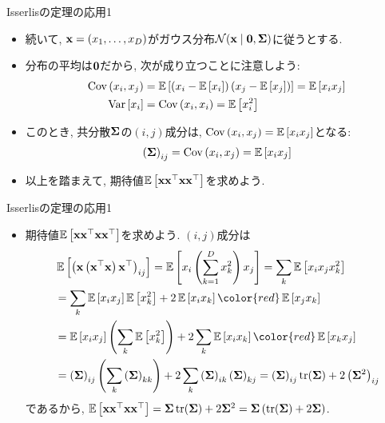 \documentclass[dvipdfmx,notheorems,t]{beamer}
\begin{document}
\begin{frame}{Isserlisの定理の応用1}
\begin{itemize}
  \item 続いて, $\vb{x} = (x_1, \ldots, x_D)$がガウス分布$\mathcal{N}(\vb{x} \mid \vb{0}, \vb{\Sigma})$に従うとする.
  \item 分布の平均は$\vb{0}$だから, 次が成り立つことに注意しよう:
  \begin{align*}
    \operatorname{Cov} \left( x_i, x_j \right) &= \operatorname{\mathbb{E}} \left[ \left( x_i - \operatorname{\mathbb{E}} \left[ x_i \right] \right) \left( x_j - \operatorname{\mathbb{E}} \left[ x_j \right] \right) \right] = \operatorname{\mathbb{E}} \left[ x_i x_j \right] \\
    \operatorname{Var} \left[ x_i \right] &= \operatorname{Cov} \left( x_i, x_i \right) = \operatorname{\mathbb{E}} \left[ x_i^2 \right]
  \end{align*}
  \item このとき, 共分散$\vb{\Sigma}$の$(i, j)$成分は, $\operatorname{Cov} \left( x_i, x_j \right) = \operatorname{\mathbb{E}} \left[ x_i x_j \right]$となる:
  \begin{align*}
    \left( \vb{\Sigma} \right)_{ij} = \operatorname{Cov} \left( x_i, x_j \right) = \operatorname{\mathbb{E}} \left[ x_i x_j \right]
  \end{align*}
  \item 以上を踏まえて, 期待値$\operatorname{\mathbb{E}} \left[ \vb{x} \vb{x}^\top \vb{x} \vb{x}^\top \right]$を求めよう.
\end{itemize}
\end{frame}

\begin{frame}{Isserlisの定理の応用1}
\begin{itemize}
  \item 期待値$\operatorname{\mathbb{E}} \left[ \vb{x} \vb{x}^\top \vb{x} \vb{x}^\top \right]$を求めよう. $(i, j)$成分は
  \begin{align*}
    & \E{\left( \vb{x} \left( \vb{x}^\top \vb{x} \right) \vb{x}^\top \right)_{ij}}
    = \E{x_i \left( \sum_{k = 1}^D x_k^2 \right) x_j}
    = \sum_k \E{x_i x_j x_k^2} \\
    &= \sum_k \E{x_i x_j} \E{x_k^2} + 2 \E{x_i x_k} {\color{red} \E{x_j x_k}} \\
    &= \E{x_i x_j} \left( \sum_k \E{x_k^2} \right)
      + 2 \sum_k \E{x_i x_k} {\color{red} \E{x_k x_j}} \\
    &= \left( \vb{\Sigma} \right)_{ij} \left( \sum_k \left( \vb{\Sigma} \right)_{kk} \right)
      + 2 \sum_k \left( \vb{\Sigma} \right)_{ik} \left( \vb{\Sigma} \right)_{kj}
    = \left( \vb{\Sigma} \right)_{ij} \tr(\vb{\Sigma}) + 2 \left( \vb{\Sigma}^2 \right)_{ij}
  \end{align*}
  であるから, $\operatorname{\mathbb{E}} \left[ \vb{x} \vb{x}^\top \vb{x} \vb{x}^\top \right] = \vb{\Sigma} \tr(\vb{\Sigma}) + 2 \vb{\Sigma}^2
    = \vb{\Sigma} \left( \tr(\vb{\Sigma}) + 2 \vb{\Sigma} \right)$.
\end{itemize}
\end{frame}
\end{document}
